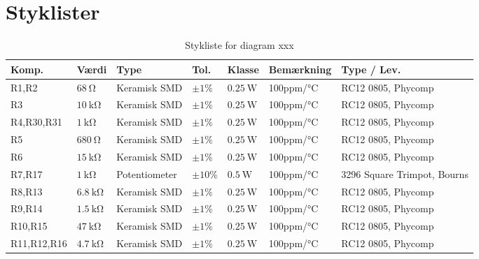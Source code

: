 \chapter{Styklister} \label{bilag:styklister}

\begin{table}[h!]
\small
\centering
\caption{Stykliste for diagram xxx}
\label{tab:udstyr}
\begin{threeparttable}
\begin{tabular}{ l l l l l l l }
\toprule
\multicolumn{1}{l}{\textbf{Komp.}}       &
\multicolumn{1}{l}{\textbf{Værdi}}       &
\multicolumn{1}{l}{\textbf{Type}}       &
\multicolumn{1}{l}{\textbf{Tol.}} &
\multicolumn{1}{l}{\textbf{Klasse}} &
\multicolumn{1}{l}{\textbf{Bemærkning}} &
\multicolumn{1}{l}{\textbf{Type / Lev.}}  \\ 
\hline
R1,R2 & $\SI{68}{\ohm}$			& Keramisk	SMD	& $\pm 1\%$ 		 & $\SI{0.25}{\watt}$	  & 100ppm/\si{\celsius}  & RC12 0805, Phycomp \\
R3 & $\SI{10}{\kilo\ohm}$		& Keramisk	SMD	& $\pm 1\%$ 		 & $\SI{0.25}{\watt}$	  & 100ppm/\si{\celsius}  & RC12 0805, Phycomp \\
R4,R30,R31 & $\SI{1}{\kilo\ohm}$		& Keramisk	SMD	& $\pm 1\%$ 		 & $\SI{0.25}{\watt}$	  & 100ppm/\si{\celsius}  & RC12 0805, Phycomp \\
R5 & $\SI{680}{\ohm}$			& Keramisk	SMD	& $\pm 1\%$ 		 & $\SI{0.25}{\watt}$	  & 100ppm/\si{\celsius}  & RC12 0805, Phycomp \\
R6 & $\SI{15}{\kilo\ohm}$		& Keramisk	SMD	& $\pm 1\%$ 		 & $\SI{0.25}{\watt}$	  & 100ppm/\si{\celsius}  & RC12 0805, Phycomp \\
R7,R17 & $\SI{1}{\kilo\ohm}$		& Potentiometer		& $\pm 10\%$ 		 & $\SI{0.5}{\watt}$	  & 100ppm/\si{\celsius}  & 3296 Square Trimpot, Bourns  \\
R8,R13 & $\SI{6.8}{\kilo\ohm}$		& Keramisk	SMD	& $\pm 1\%$ 		 & $\SI{0.25}{\watt}$	  & 100ppm/\si{\celsius}  & RC12 0805, Phycomp \\
R9,R14 & $\SI{1.5}{\kilo\ohm}$		& Keramisk	SMD	& $\pm 1\%$ 		 & $\SI{0.25}{\watt}$	  & 100ppm/\si{\celsius}  & RC12 0805, Phycomp \\
R10,R15 & $\SI{47}{\kilo\ohm}$		& Keramisk	SMD	& $\pm 1\%$ 		 & $\SI{0.25}{\watt}$	  & 100ppm/\si{\celsius}  & RC12 0805, Phycomp \\
R11,R12,R16 & $\SI{4.7}{\kilo\ohm}$		& Keramisk	SMD	& $\pm 1\%$ 		 & $\SI{0.25}{\watt}$	  & 100ppm/\si{\celsius}  & RC12 0805, Phycomp \\

\end{tabular}
\end{threeparttable}
\end{table}
